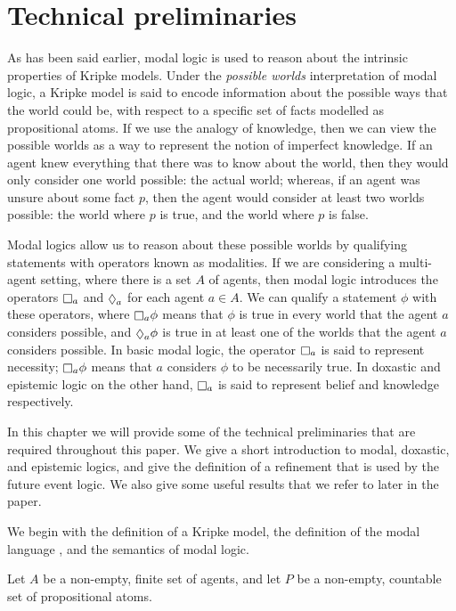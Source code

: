 \chapter{Technical preliminaries}

As has been said earlier, modal logic is used to reason about the intrinsic
properties of Kripke models. Under the {\em possible worlds} interpretation of
modal logic, a Kripke model is said to encode information about the possible
ways that the world could be, with respect to a specific set of facts modelled
as propositional atoms. If we use the analogy of knowledge, then we can view the
possible worlds as a way to represent the notion of imperfect knowledge. If an
agent knew everything that there was to know about the world, then they would
only consider one world possible: the actual world; whereas, if an agent was
unsure about some fact $p$, then the agent would consider at least two worlds
possible: the world where $p$ is true, and the world where $p$ is false.

Modal logics allow us to reason about these possible worlds by qualifying
statements with operators known as modalities. If we are considering a
multi-agent setting, where there is a set $A$ of agents, then modal logic
introduces the operators $\knows_a$ and $\suspects_a$ for each agent $a \in A$.
We can qualify a statement $\phi$ with these operators, where $\knows_a \phi$
means that $\phi$ is true in every world that the agent $a$ considers possible,
and $\suspects_a \phi$ is true in at least one of the worlds that the agent $a$
considers possible. In basic modal logic, the operator $\knows_a$ is said to
represent necessity; $\knows_a \phi$ means that $a$ considers $\phi$ to be
necessarily true. In doxastic and epistemic logic on the other hand, $\knows_a$
is said to represent belief and knowledge respectively.

In this chapter we will provide some of the technical preliminaries that are
required throughout this paper. We give a short introduction to modal, doxastic,
and epistemic logics, and give the definition of a refinement that is used by
the future event logic. We also give some useful results that we refer to later
in the paper.

We begin with the definition of a Kripke model, the definition of the modal
language \lang{}, and the semantics of modal logic.

Let $A$ be a non-empty, finite set of agents, and let $P$ be a non-empty,
countable set of propositional atoms.

